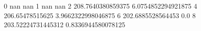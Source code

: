 0 nan nan
1 nan nan
2 208.7640380859375 6.0754852294921875
4 206.65478515625 3.9662322998046875
6 202.6885528564453 0.0
8 203.52224731445312 0.8336944580078125
